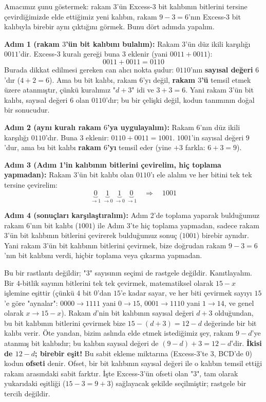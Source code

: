 \begin{ornek}
Amacımız şunu göstermek: rakam $3$'ün Excess-3 bit kalıbının bitlerini tersine çevirdiğimizde
elde ettiğimiz yeni kalıbın, rakam $9-3=6$'nın Excess-3 bit kalıbıyla birebir aynı çıktığını
görmek. Bunu dört adımda yapalım.

\noindent\textbf{Adım 1 (rakam $3$'ün bit kalıbını bulalım):} Rakam $3$'ün düz ikili karşılığı
$0011$'dir. Excess-3 kuralı gereği buna $3$ eklenir (yani $0011+0011$):
\[
0011+0011=0110
\]
Burada dikkat edilmesi gereken can alıcı nokta şudur: $0110$'nın \textbf{sayısal değeri}
$6$'dır ($4+2=6$). Ama bu bit kalıbı, rakam $6$'yı değil, \textbf{rakam $3$'ü} temsil etmek
üzere atanmıştır, çünkü kuralımız "$d+3$" idi ve $3+3=6$. Yani rakam $3$'ün bit kalıbı,
sayısal değeri $6$ olan $0110$'dır; bu bir çelişki değil, kodun tanımının doğal bir
sonucudur.

\noindent\textbf{Adım 2 (aynı kuralı rakam $6$'ya uygulayalım):} Rakam $6$'nın düz ikili
karşılığı $0110$'dır. Buna $3$ eklenir: $0110+0011=1001$. $1001$'in sayısal değeri $9$'dur,
ama bu bit kalıbı \textbf{rakam $6$'yı} temsil eder (yine $+3$ farkla: $6+3=9$).

\noindent\textbf{Adım 3 (Adım 1'in kalıbının bitlerini çevirelim, hiç toplama yapmadan):}
Rakam $3$'ün bit kalıbı olan $0110$'ı ele alalım ve her bitini tek tek tersine çevirelim:
\[
\underbrace{0}_{\to1}\ \underbrace{1}_{\to0}\ \underbrace{1}_{\to0}\ \underbrace{0}_{\to1}
\quad\Rightarrow\quad 1001
\]

\noindent\textbf{Adım 4 (sonuçları karşılaştıralım):} Adım 2'de toplama yaparak bulduğumuz
rakam $6$'nın bit kalıbı ($1001$) ile Adım 3'te hiç toplama yapmadan, sadece rakam $3$'ün
bit kalıbının bitlerini çevirerek bulduğumuz sonuç ($1001$) birebir aynıdır. Yani rakam
$3$'ün bit kalıbının bitlerini çevirmek, bize doğrudan rakam $9-3=6$'nın bit kalıbını verdi,
hiçbir toplama veya çıkarma yapmadan.
\end{ornek}

Bu bir rastlantı değildir; "$3$" sayısının seçimi de rastgele değildir. Kanıtlayalım.
Bir $4$-bitlik sayının bitlerini tek tek çevirmek, matematiksel olarak $15-x$ işlemine
eşittir (çünkü $4$ bit $0$'dan $15$'e kadar sayar, ve her biti çevirmek sayıyı $15$'e göre
"aynalar": $0000\to1111$ yani $0\to15$, $0001\to1110$ yani $1\to14$, ve genel olarak
$x\to15-x$). Rakam $d$'nin bit kalıbının sayısal değeri $d+3$ olduğundan, bu bit kalıbının
bitlerini çevirmek bize $15-(d+3)=12-d$ değerinde bir bit kalıbı verir. Öte yandan, bizim
aslında elde etmek istediğimiz şey, rakam $9-d$'ye atanmış bit kalıbıdır; bu kalıbın
sayısal değeri de $(9-d)+3=12-d$'dir. \textbf{İkisi de $12-d$; birebir eşit!} Bu sabit
ekleme miktarına (Excess-3'te $3$, BCD'de $0$) kodun \textbf{ofseti} denir. Ofset, bir
bit kalıbının sayısal değeri ile o kalıbın temsil ettiği rakam arasındaki sabit farktır.
İşte Excess-3'ün ofseti olan "$3$", tam olarak yukarıdaki eşitliği ($15-3=9+3$) sağlayacak
şekilde seçilmiştir; rastgele bir tercih değildir.

